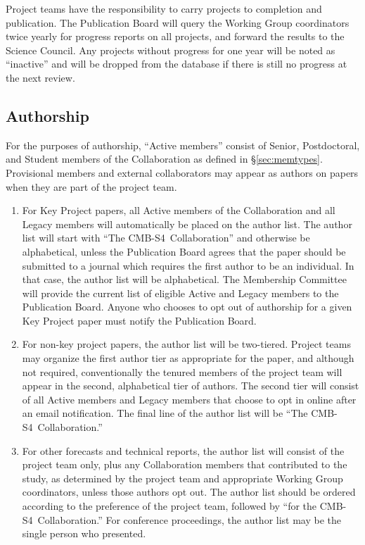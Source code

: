 \documentclass[12pt]{article}
\newcommand\collabname{CMB-S4}
\begin{document}
Project teams have the responsibility to carry projects to completion and publication.  The Publication Board will query the Working Group coordinators twice yearly for progress reports on all projects, and forward the results to the Science Council.  Any projects without progress for one year will be noted as ``inactive'' and will be dropped from the database if there is still no progress at the next review.

\subsection{Authorship}

For the purposes of authorship, ``Active members'' consist of Senior, Postdoctoral, and Student members of the Collaboration as defined in \S\ref{sec:memtypes}.  Provisional members and external collaborators may appear as authors on papers when they are part of the project team.

\begin{enumerate}

\item For Key Project papers, all Active members of the Collaboration and all Legacy members will automatically be placed on the author list.  The author list will start with ``The \collabname\ Collaboration'' and otherwise be alphabetical, unless the Publication Board agrees that the paper should be submitted to a journal which requires the first author to be an individual.  In that case, the author list will be alphabetical. The Membership Committee will provide the current list of eligible Active and Legacy members to the Publication Board. Anyone who chooses to opt out of authorship for a given Key Project paper must  notify the Publication Board.

\item For non-key project papers, the author list will be two-tiered. Project teams may organize the first author tier as appropriate for the paper, and although not required, conventionally the tenured members of the project team will appear in the second, alphabetical tier of authors. The second tier will consist of all Active members and Legacy members that choose to opt in online after an email notification.  The final line of the author list will be ``The \collabname\ Collaboration.''

\item For other forecasts and technical reports, the author list will consist of the project team only, plus any Collaboration members that contributed to the study, as determined by the project team and appropriate Working Group coordinators, unless those authors opt out.  The author list should be ordered according to the preference of the project team, followed by ``for the \collabname\ Collaboration.''  For conference proceedings, the author list may be the single person who presented.

\end{enumerate}
\end{document}
